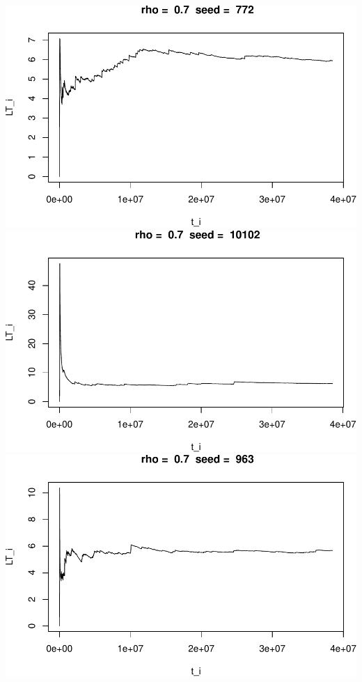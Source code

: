 \documentclass[]{article}
\begin{document}
\includegraphics{003_files/figure-latex/unnamed-chunk-17-1.pdf}
\includegraphics{003_files/figure-latex/unnamed-chunk-17-2.pdf}
\includegraphics{003_files/figure-latex/unnamed-chunk-17-3.pdf}
\end{document}
